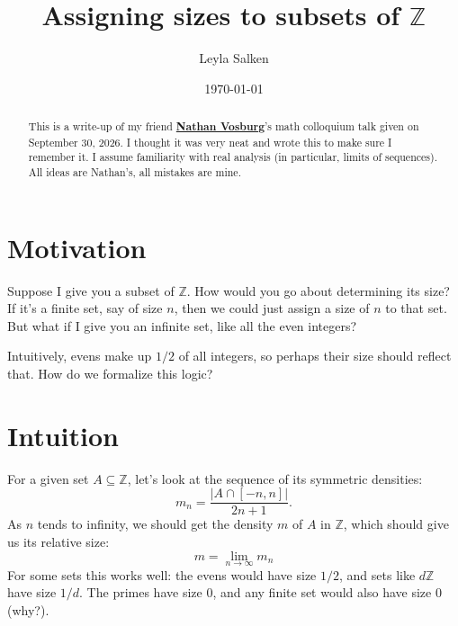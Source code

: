 \documentclass[12pt,reqno]{amsart}
\theoremstyle{plain} %
\theoremstyle{remark}
\theoremstyle{definition}
\newcommand{\Z}{\mathbb Z}
\begin{document}





\title{Assigning sizes to subsets of $\Z$}
\author{Leyla Salken}
\date{\today}

\begin{abstract}
This is a write-up of my friend \href{https://navo.dev/}{\textbf{Nathan Vosburg}}'s math colloquium talk given on September 30, 2026. I thought it was very neat and wrote this to make sure I remember it. I assume familiarity with real analysis (in particular, limits of sequences).
All ideas are Nathan's, all mistakes are mine.
\end{abstract}

\maketitle
\thispagestyle{empty}

\vspace{-1cm}
\section{Motivation} \label{sect:0}

Suppose I give you a subset of $\Z$. How would you go about determining its size? If it's a finite set, say of size $n$, then we could just assign a size of $n$ to that set. But what if I give you an infinite set, like all the even integers? 

Intuitively, evens make up $1/2$ of all integers, so perhaps their size should reflect that. How do we formalize this logic?

\section{Intuition}
For a given set $A \subseteq \Z$, let's look at the sequence of its symmetric densities:
\[
m_n = \frac{\left| A \cap [-n,n]\right|}{2n+1}.
\]
As $n$ tends to infinity, we should get the density $m$ of $A$ in $\Z$, which should give us its relative size:
\[
m = \lim_{n \rightarrow \infty } m_n
\]
For some sets this works well:
the evens would have size $1/2$, and sets like $d\Z$ have size $1/d$. The primes have size 0, and any finite set would also have size 0 (why?). 
\end{document}
